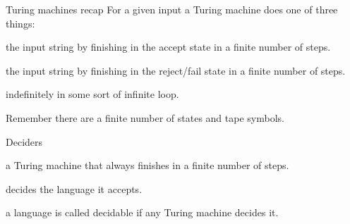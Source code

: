 \documentclass{beamer}
\begin{document}
  
  \begin{frame}{Turing machines recap}
    For a given input a Turing machine does one of three things:
    \vspace{4mm}
    \begin{description}
      \setlength\itemsep{6mm}
      \item[Accepts] the input string by finishing in the accept state in a finite number of steps.
      \item[Rejects] the input string by finishing in the reject/fail state in a finite number of steps.
      \item[Continues] indefinitely in some sort of infinite loop.
    \end{description}
    \vspace{4mm}
    Remember there are a finite number of states and tape symbols.
  \end{frame}
  
  
  \begin{frame}{Deciders}
    \vspace{2mm}
    \begin{description}
      \setlength\itemsep{6mm}
      \item[Decider:] a Turing machine that always finishes in a finite number of steps.
      \item[Decides:] decides the language it accepts.
      \item[Decidable:] a language is called decidable if any Turing machine decides it.
    \end{description}
    \vspace{2mm}
  \end{frame}

  
\end{document}
